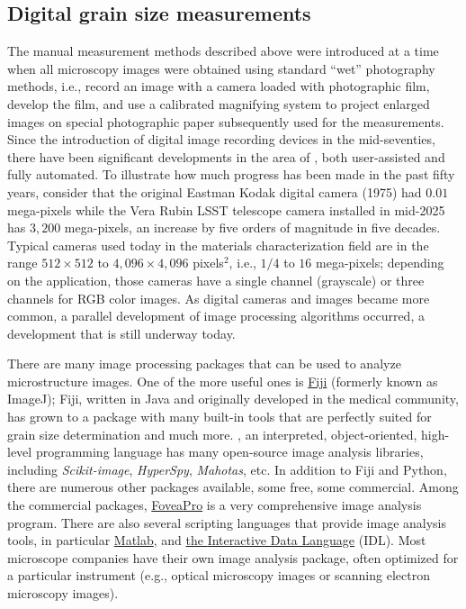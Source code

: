 \subsection{Digital grain size measurements}
The manual measurement methods described above were introduced at a time when all microscopy images were obtained using standard ``wet'' photography methods, i.e., record an image with a camera loaded with photographic film, develop the film, and use a calibrated magnifying system to project enlarged images on special photographic paper subsequently used for the measurements. Since the introduction of digital image recording devices in the mid-seventies, there have been significant developments in the area of , both user-assisted and fully automated.  To illustrate how much progress has been made in the past fifty years, consider that the original Eastman Kodak digital camera (1975) had $0.01$ mega-pixels while the Vera Rubin LSST telescope camera installed in mid-2025 has $3,200$ mega-pixels, an increase by five orders of magnitude in five decades.  Typical cameras used today in the materials characterization field are in the range $512\times 512$ to $4,096\times 4,096$ pixels$^2$, i.e., $1/4$ to $16$ mega-pixels; depending on the application, those cameras have a single channel (grayscale) or three channels for RGB color images.  As digital cameras and images became more common, a parallel development of image processing algorithms occurred, a development that is still underway today.

There are many image processing packages that can be used to analyze microstructure images.  One of the more useful ones is \href{https://imagej.net/Fiji/Downloads}{{\color{blue}Fiji}} (formerly known as ImageJ); Fiji, written in Java and originally developed in the medical community, has grown to a package with many built-in tools that are perfectly suited for grain size determination and much more.  , an interpreted, object-oriented, high-level programming language has many open-source image analysis libraries, including \textit{Scikit-image}, \textit{HyperSpy}, \textit{Mahotas}, etc.  In addition to Fiji and Python, there are numerous other packages available, some free, some commercial.  Among the commercial packages, \href{http://www.reindeergraphics.com}{{\color{blue}FoveaPro}} is a very comprehensive image analysis program. There are also several scripting languages that provide image analysis tools, in particular \href{http://www.mathworks.com}{{\color{blue}Matlab}}, and \href{https://www.harrisgeospatial.com/docs/using_idl_home.html}{the {\color{blue}Interactive Data Language}} (IDL).  Most microscope companies have their own image analysis package, often optimized for a particular instrument (e.g., optical microscopy images or scanning electron microscopy images).

